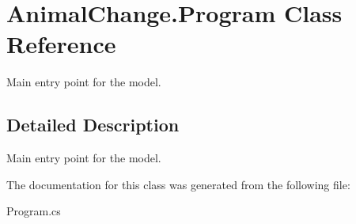 \hypertarget{class_animal_change_1_1_program}{}\section{Animal\+Change.\+Program Class Reference}
\label{class_animal_change_1_1_program}


Main entry point for the model.  




\subsection{Detailed Description}
Main entry point for the model. 

The documentation for this class was generated from the following file\+:\begin{DoxyCompactItemize}
\item 
Program.\+cs\end{DoxyCompactItemize}
